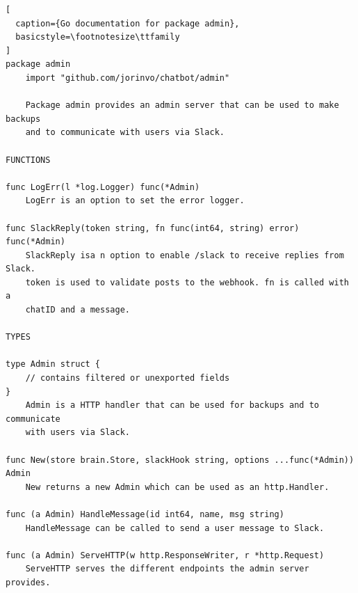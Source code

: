 \pagebreak
\begin{lstlisting}[
  caption={Go documentation for package admin},
  basicstyle=\footnotesize\ttfamily
]
package admin
    import "github.com/jorinvo/chatbot/admin"

    Package admin provides an admin server that can be used to make backups
    and to communicate with users via Slack.

FUNCTIONS

func LogErr(l *log.Logger) func(*Admin)
    LogErr is an option to set the error logger.

func SlackReply(token string, fn func(int64, string) error) func(*Admin)
    SlackReply isa n option to enable /slack to receive replies from Slack.
    token is used to validate posts to the webhook. fn is called with a
    chatID and a message.

TYPES

type Admin struct {
    // contains filtered or unexported fields
}
    Admin is a HTTP handler that can be used for backups and to communicate
    with users via Slack.

func New(store brain.Store, slackHook string, options ...func(*Admin)) Admin
    New returns a new Admin which can be used as an http.Handler.

func (a Admin) HandleMessage(id int64, name, msg string)
    HandleMessage can be called to send a user message to Slack.

func (a Admin) ServeHTTP(w http.ResponseWriter, r *http.Request)
    ServeHTTP serves the different endpoints the admin server provides.
\end{lstlisting}


